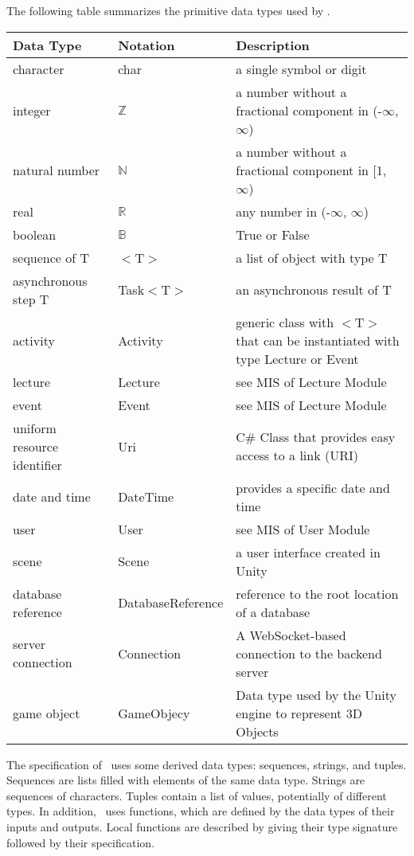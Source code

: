 \documentclass[12pt, titlepage]{article}
\begin{document}
The following table summarizes the primitive data types used by \progname. 

\begin{center}
\renewcommand{\arraystretch}{1.2}
\noindent 
\begin{tabular}{l l p{7.5cm}} 
\toprule 
\textbf{Data Type} & \textbf{Notation} & \textbf{Description}\\ 
\midrule
character & char & a single symbol or digit\\
integer & $\mathbb{Z}$ & a number without a fractional component in (-$\infty$, $\infty$) \\
natural number & $\mathbb{N}$ & a number without a fractional component in [1, $\infty$) \\
real & $\mathbb{R}$ & any number in (-$\infty$, $\infty$)\\
boolean & $\mathbb{B}$ & True or False\\
sequence of T & $<$T$>$ & a list of object with type T\\
asynchronous step T & Task$<$T$>$ & an asynchronous result of T\\
activity & Activity & generic class with $<$T$>$ that can be instantiated with type Lecture or Event\\
lecture & Lecture & see MIS of Lecture Module \\
event & Event & see MIS of Lecture Module \\
uniform resource identifier & Uri & C\# Class that provides easy access to a link (URI) \\
date and time & DateTime & provides a specific date and time \\
user & User & see MIS of User Module \\
scene & Scene & a user interface created in Unity \\
database reference & DatabaseReference & reference to the root location of a database \\
server connection & Connection & A WebSocket-based connection to the backend server \\
game object & GameObjecy & Data type used by the Unity engine to represent 3D Objects \\


\bottomrule
\end{tabular} 
\end{center}

\noindent
The specification of \progname \ uses some derived data types: sequences, strings, and
tuples. Sequences are lists filled with elements of the same data type. Strings
are sequences of characters. Tuples contain a list of values, potentially of
different types. In addition, \progname \ uses functions, which
are defined by the data types of their inputs and outputs. Local functions are
described by giving their type signature followed by their specification.
\end{document}
